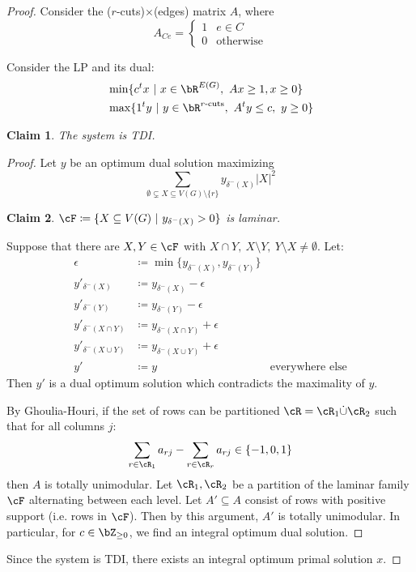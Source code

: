 \documentclass[11pt, a4paper]{article}
\newcommand{\abs}[1]{\left\lvert#1\right\rvert}
\newcommand{\set}[1]{\{#1\}}
\newtheorem*{claim}{Claim}
\theoremstyle{remark}
\theoremstyle{definition}
\begin{document}
\begin{proof}
	Consider the ($r$-cuts)$\times$(edges) matrix $A$, where
	\[A_{Ce}=\begin{cases}
			1 & e\in C           \\
			0 & \text{otherwise}
		\end{cases}\]

	Consider the LP and its dual:
	\begin{align*}
		 & \min\set{c^tx\ |\ x\in \bR^{E(G)},\ Ax\geq 1, x\geq0}            \\
		 & \max\set{1^ty\ |\ y\in\bR^{r\text{-cuts}},\ A^ty\leq c,\ y\geq0}
	\end{align*}
	\begin{claim}
		The system is TDI.
	\end{claim}
	\begin{proof}
		Let $y$ be an optimum dual solution maximizing
		\[\sum_{\emptyset\subsetneq X\subseteq V(G)\setminus\set{r}}y_{\delta^-(X)}\abs{X}^2\]
		\begin{claim}
			$\cF\coloneqq \set{X\subseteq V(G)\  |\ y_{\delta^-(X)}>0}$ is laminar.
		\end{claim}
		Suppose that there are $X,Y\in\cF$ with $X\cap Y,\ X\setminus Y,\ Y\setminus X
			\neq\emptyset$. Let:
		\begin{align*}
			\epsilon               & \coloneqq \min\set{y_{\delta^-(X)},y_{\delta^-(Y)}}                          \\
			y'_{\delta^-(X)}       & \coloneqq y_{\delta^-(X)}-\epsilon                                           \\
			y'_{\delta^-(Y)}       & \coloneqq y_{\delta^-(Y)}-\epsilon                                           \\
			y'_{\delta^-(X\cap Y)} & \coloneqq y_{\delta^-(X\cap Y)}+\epsilon                                     \\
			y'_{\delta^-(X\cup Y)} & \coloneqq y_{\delta^-(X\cup Y)}+\epsilon                                     \\
			y'                     & \coloneqq y                                         & \text{everywhere else}
		\end{align*}
		Then $y'$ is a dual optimum solution which contradicts the maximality of $y$.

		By Ghoulia-Houri, if the set of rows can be partitioned
		$\cR=\cR_1\dot\cup \cR_2$ such that for all columns $j$:
		\[\sum_{r\in\cR_1}a_{rj}-\sum_{r\in\cR_r}a_{rj}\in\set{-1,0,1}\]
		then $A$ is totally unimodular. Let $\cR_1,\cR_2$ be a partition of
		the laminar family $\cF$ alternating between each level. Let
		$A'\subseteq A$ consist of rows with positive support (i.e. rows in
		$\cF$). Then by this argument, $A'$ is totally unimodular. In
		particular, for $c\in \bZ_{\geq0}$, we find an integral optimum dual
		solution.
	\end{proof}
	Since the system is TDI, there exists an integral optimum primal solution
	$x$.
\end{proof}
\end{document}
